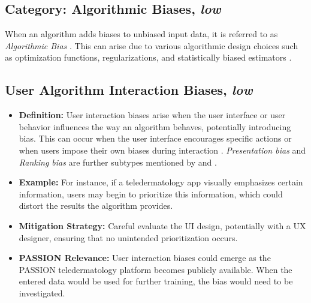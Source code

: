 \documentclass[12pt, a4paper, oneside]{book}   	%
\begin{document}
\begin{appendices}
		
		\section{Category: Algorithmic Biases, \textit{low}} \label{app:biasCategoryAlgorithmicBiasesLow}
		When an algorithm adds biases to unbiased input data, it is referred to as \textit{Algorithmic Bias} \autocite{M9_Baeza-Yates_2018}. This can arise due to various algorithmic design choices such as optimization functions, regularizations, and statistically biased estimators \autocite{M44_Danks_2017}.
		
		\subsection{User Algorithm Interaction Biases, \textit{low}}
		\begin{itemize}
			\item \textbf{Definition:} User interaction biases arise when the user interface or user behavior influences the way an algorithm behaves, potentially introducing bias. This can occur when the user interface encourages specific actions or when users impose their own biases during interaction \autocite{M9_Baeza-Yates_2018}. \textit{Presentation bias} and \textit{Ranking bias} are further subtypes mentioned by \textcite{M93_Lerman_2014} and \textcite{Mehrabi_2021}.
			\item \textbf{Example:} For instance, if a \gls{teledermatology} app visually emphasizes certain information, users may begin to prioritize this information, which could distort the results the algorithm provides.
			\item \textbf{Mitigation Strategy:} Careful evaluate the UI design, potentially with a UX designer, ensuring that no unintended prioritization occurs.
			\item \textbf{PASSION Relevance:} User interaction biases could emerge as the PASSION \gls{teledermatology} platform becomes publicly available. When the entered data would be used for further training, the bias would need to be investigated.
		\end{itemize}
		

\end{appendices}
\end{document}
